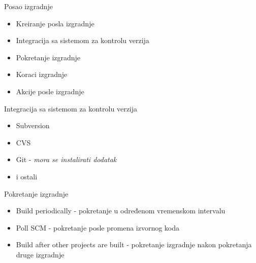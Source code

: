 \documentclass[10pt]{beamer}
\begin{document}
\begin{frame}[fragile]{Posao izgradnje}
  \begin{itemize}
            \item Kreiranje posla izgradnje
            \item Integracija sa sistemom za kontrolu verzija
            \item Pokretanje izgradnje
			\item Koraci izgradnje
            \item Akcije posle izgradnje
  \end{itemize}
\end{frame}

\begin{frame}[fragile]{Integracija sa sistemom za kontrolu verzija}
  \begin{itemize}
            \item Subversion
            \item CVS
            \item Git - \alert{\emph{mora se instalirati dodatak}}
			\item i ostali
  \end{itemize}            
\end{frame}

\begin{frame}[fragile]{Pokretanje izgradnje}
  \begin{itemize}
            \item Build periodically - pokretanje u određenom vremenskom intervalu
            \item Poll SCM - pokretanje posle promena izvornog koda
            \item Build after other projects are built - pokretanje izgradnje nakon pokretanja druge izgradnje
  \end{itemize}
\end{frame}
\end{document}

